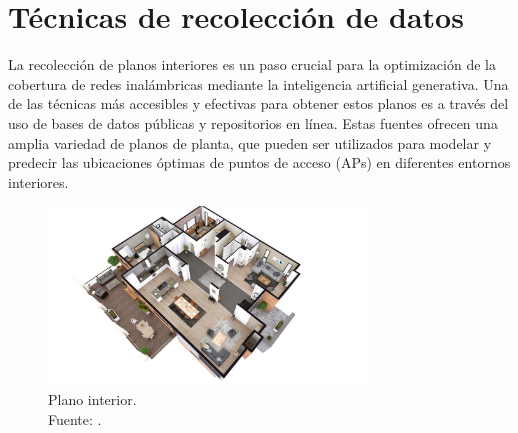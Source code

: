 \section{Técnicas de recolección de datos}
La recolección de planos interiores es un paso crucial para la optimización de la cobertura de redes inalámbricas mediante la inteligencia artificial generativa. Una de las técnicas más accesibles y efectivas para obtener estos planos es a través del uso de bases de datos públicas y repositorios en línea. Estas fuentes ofrecen una amplia variedad de planos de planta, que pueden ser utilizados para modelar y predecir las ubicaciones óptimas de puntos de acceso (APs) en diferentes entornos interiores.

\begin{figure}[h]
	\begin{center}
		\includegraphics[width=0.75\textwidth]{3/figures/plano2d.jpg}
		\caption[Plano interior]{Plano interior.\\
			Fuente: \cite{art_wu2019interior}.}
		\label{3:fig1}
	\end{center}
\end{figure}

